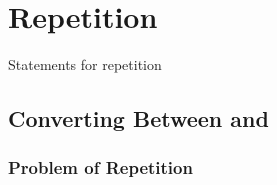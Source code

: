 \section{Repetition}
\label{sec:flow:repetition}


\begin{syntaxfloat}
  
  \caption{Statements for repetition}
  \label{syntax:flow:repetition}
\end{syntaxfloat}

\subsection{}



\subsection{}



\subsection{Converting Between  and }



\subsubsection{Problem of Repetition}



\subsection{}




